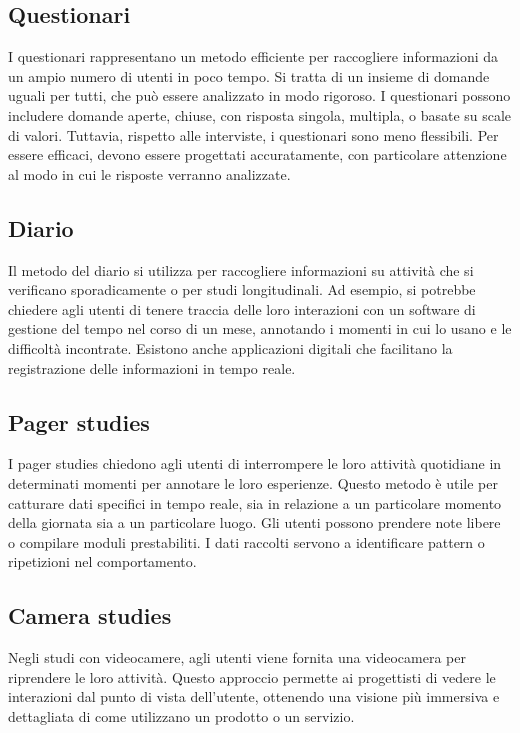 \subsection{Questionari}
I questionari rappresentano un metodo efficiente per raccogliere informazioni da un ampio numero di utenti in poco tempo. Si tratta di un insieme di domande uguali per tutti, che può essere analizzato in modo rigoroso. I questionari possono includere domande aperte, chiuse, con risposta singola, multipla, o basate su scale di valori. Tuttavia, rispetto alle interviste, i questionari sono meno flessibili. Per essere efficaci, devono essere progettati accuratamente, con particolare attenzione al modo in cui le risposte verranno analizzate.

\subsection{Diario}
Il metodo del diario si utilizza per raccogliere informazioni su attività che si verificano sporadicamente o per studi longitudinali. Ad esempio, si potrebbe chiedere agli utenti di tenere traccia delle loro interazioni con un software di gestione del tempo nel corso di un mese, annotando i momenti in cui lo usano e le difficoltà incontrate. Esistono anche applicazioni digitali che facilitano la registrazione delle informazioni in tempo reale.

\subsection{Pager studies}
I pager studies chiedono agli utenti di interrompere le loro attività quotidiane in determinati momenti per annotare le loro esperienze. Questo metodo è utile per catturare dati specifici in tempo reale, sia in relazione a un particolare momento della giornata sia a un particolare luogo. Gli utenti possono prendere note libere o compilare moduli prestabiliti. I dati raccolti servono a identificare pattern o ripetizioni nel comportamento.

\subsection{Camera studies}
Negli studi con videocamere, agli utenti viene fornita una videocamera per riprendere le loro attività. Questo approccio permette ai progettisti di vedere le interazioni dal punto di vista dell'utente, ottenendo una visione più immersiva e dettagliata di come utilizzano un prodotto o un servizio.